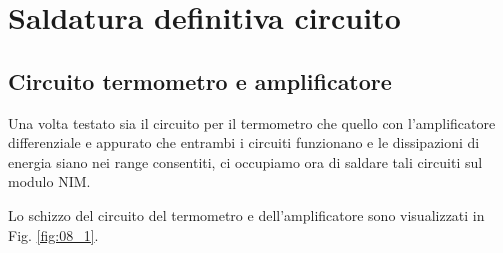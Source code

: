 \documentclass[../main/main.tex]{subfiles}
\begin{document}
\chapter{Saldatura definitiva circuito}


\section{Circuito termometro e amplificatore}

Una volta testato sia il circuito per il termometro che quello con l'amplificatore differenziale e appurato che entrambi i circuiti funzionano e le dissipazioni di energia siano nei range consentiti, ci occupiamo ora di saldare tali circuiti sul modulo NIM.

Lo schizzo del circuito del termometro e dell'amplificatore sono visualizzati in Fig. \ref{fig:08_1}.
\end{document}
